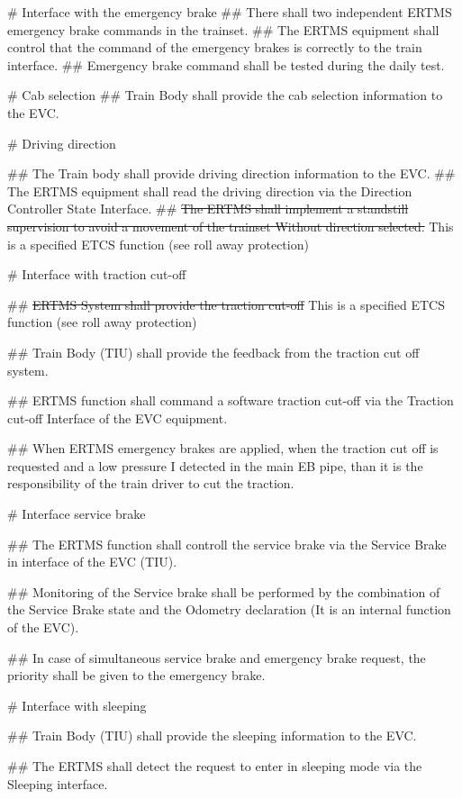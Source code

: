 \documentclass{template/openetcs_article}
\begin{document}
\begin{easylist}
# Interface with the emergency brake
## There shall two independent ERTMS emergency brake commands in the trainset.
## The ERTMS equipment shall control that the command of the emergency brakes is correctly to the train interface.
## Emergency brake command shall be tested during the daily test.


# Cab selection
## Train Body shall provide the cab selection information to the EVC.


# Driving direction

## The Train body shall provide driving direction information to the EVC.
## The ERTMS equipment shall read the driving direction via the Direction Controller State Interface.
## \sout{The ERTMS shall implement a standstill supervision to avoid a movement of the trainset Without direction selected.} This is a specified ETCS function (see roll away protection)


# Interface with traction cut-off

## \sout {ERTMS System shall provide the traction cut-off}  This is a specified ETCS function (see roll away protection)


## Train Body (TIU) shall provide the feedback from the traction cut off system.

## ERTMS function shall command a software traction cut-off via the Traction cut-off Interface of the EVC equipment.

## When ERTMS emergency brakes are applied, when the traction cut off is requested and a low pressure I detected in the main EB pipe, than it is the responsibility of the train driver to cut the traction.


# Interface service brake


## The ERTMS function shall controll the service brake via the Service Brake in interface of the EVC (TIU).

## Monitoring of the Service brake shall be performed by the combination of the Service Brake state and the Odometry declaration (It is an internal function of the EVC).

## In case of simultaneous service brake and emergency brake request, the priority shall be given to the emergency brake.


# Interface with sleeping

## Train Body (TIU) shall provide the sleeping information to the EVC.

## The ERTMS shall detect the request to enter in sleeping mode via the Sleeping interface.


\end{easylist}
\end{document}
